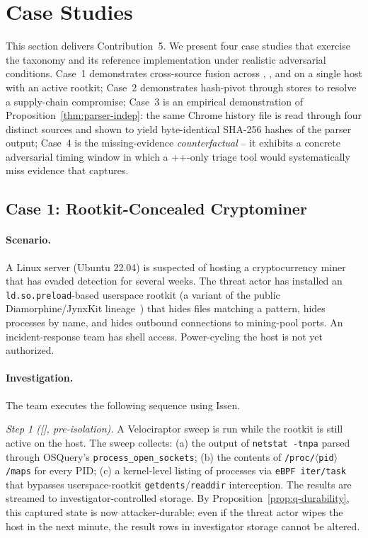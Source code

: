 \section{Case Studies}
\label{sec:cases}

This section delivers Contribution~5. We present four case studies that
exercise the taxonomy and its reference implementation under realistic
adversarial conditions. Case~1 demonstrates cross-source fusion across
, , and  on a single host with an active rootkit;
Case~2 demonstrates hash-pivot through  stores to resolve a
supply-chain compromise; Case~3 is an empirical demonstration of
Proposition~\ref{thm:parser-indep}: the same Chrome history file is read
through four distinct sources and shown to yield byte-identical SHA-256
hashes of the parser output; Case~4 is the missing-evidence
\emph{counterfactual} -- it exhibits a concrete adversarial timing window
in which a ++-only triage tool would systematically
miss evidence that  captures.

\subsection{Case 1: Rootkit-Concealed Cryptominer}
\label{sec:case1}

\paragraph{Scenario.}
A Linux server (Ubuntu 22.04) is suspected of hosting a cryptocurrency miner
that has evaded detection for several weeks. The threat actor has
installed an \texttt{ld.so.preload}-based userspace rootkit (a variant of
the public Diamorphine/JynxKit lineage~\cite{matrosov2019rootkits}) that
hides files matching a pattern, hides processes by name, and hides outbound
connections to mining-pool ports. An incident-response team has shell
access. Power-cycling the host is not yet authorized.

\paragraph{Investigation.}
The team executes the following sequence using Issen.

\noindent\emph{Step 1 ([], pre-isolation).} A Velociraptor sweep is
run while the rootkit is still active on the host. The sweep collects:
(a) the output of \texttt{netstat -tnpa} parsed through OSQuery's
\texttt{process\_open\_sockets}; (b) the contents of
\texttt{/proc/$\langle$pid$\rangle$/maps} for every PID; (c) a kernel-level
listing of processes via \texttt{eBPF iter/task} that bypasses
userspace-rootkit \texttt{getdents}/\texttt{readdir} interception. The
results are streamed to investigator-controlled storage. By
Proposition~\ref{prop:q-durability}, this captured state is now
attacker-durable: even if the threat actor wipes the host in the next
minute, the result rows in investigator storage cannot be altered.

